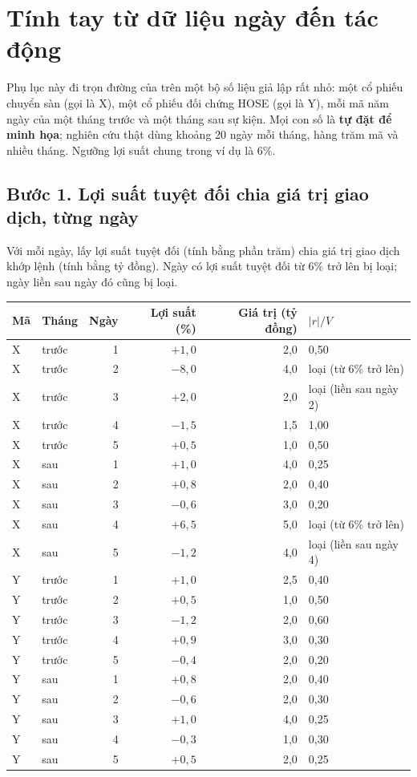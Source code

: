 \chapter{Tính tay từ dữ liệu ngày đến tác động}\label{pl:tinhtay}

Phụ lục này đi trọn đường của  trên một bộ số liệu giả lập rất nhỏ: một cổ phiếu chuyển sàn (gọi là X), một cổ phiếu đối chứng HOSE (gọi là Y), mỗi mã năm ngày của một tháng trước và một tháng sau sự kiện. Mọi con số là \textbf{tự đặt để minh họa}; nghiên cứu thật dùng khoảng 20 ngày mỗi tháng, hàng trăm mã và nhiều tháng. Ngưỡng lợi suất chung trong ví dụ là 6\%.

\section*{Bước 1. Lợi suất tuyệt đối chia giá trị giao dịch, từng ngày}

Với mỗi ngày, lấy lợi suất tuyệt đối (tính bằng phần trăm) chia giá trị giao dịch khớp lệnh (tính bằng tỷ đồng). Ngày có lợi suất tuyệt đối từ 6\% trở lên bị loại; ngày liền sau ngày đó cũng bị loại.

\begin{center}
{\bangnho
\begin{tabular}{@{}llrrrl@{}}
\toprule
Mã & Tháng & Ngày & Lợi suất (\%) & Giá trị (tỷ đồng) & $|r|/V$\\
\midrule
X & trước & 1 & $+1{,}0$ & 2,0 & 0,50\\
X & trước & 2 & $-8{,}0$ & 4,0 & loại (từ 6\% trở lên)\\
X & trước & 3 & $+2{,}0$ & 2,0 & loại (liền sau ngày 2)\\
X & trước & 4 & $-1{,}5$ & 1,5 & 1,00\\
X & trước & 5 & $+0{,}5$ & 1,0 & 0,50\\
\addlinespace
X & sau & 1 & $+1{,}0$ & 4,0 & 0,25\\
X & sau & 2 & $+0{,}8$ & 2,0 & 0,40\\
X & sau & 3 & $-0{,}6$ & 3,0 & 0,20\\
X & sau & 4 & $+6{,}5$ & 5,0 & loại (từ 6\% trở lên)\\
X & sau & 5 & $-1{,}2$ & 4,0 & loại (liền sau ngày 4)\\
\addlinespace
Y & trước & 1 & $+1{,}0$ & 2,5 & 0,40\\
Y & trước & 2 & $+0{,}5$ & 1,0 & 0,50\\
Y & trước & 3 & $-1{,}2$ & 2,0 & 0,60\\
Y & trước & 4 & $+0{,}9$ & 3,0 & 0,30\\
Y & trước & 5 & $-0{,}4$ & 2,0 & 0,20\\
\addlinespace
Y & sau & 1 & $+0{,}8$ & 2,0 & 0,40\\
Y & sau & 2 & $-0{,}6$ & 2,0 & 0,30\\
Y & sau & 3 & $+1{,}0$ & 4,0 & 0,25\\
Y & sau & 4 & $-0{,}3$ & 1,0 & 0,30\\
Y & sau & 5 & $+0{,}5$ & 2,0 & 0,25\\
\bottomrule
\end{tabular}}
\end{center}

